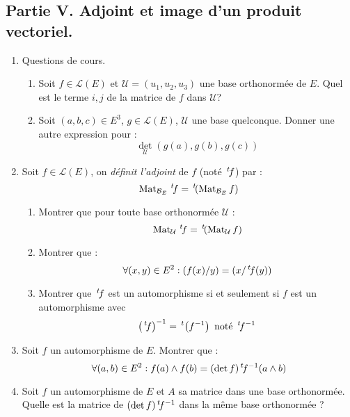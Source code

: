 \subsection*{Partie V. Adjoint et image d'un produit vectoriel.}
\begin{enumerate}
 \item Questions de cours.
\begin{enumerate}
 \item Soit $f\in \mathcal L(E)$ et $\mathcal U = (u_1,u_2,u_3)$ une base orthonormée de $E$. Quel est le terme $i,j$ de la matrice de $f$ dans $\mathcal U$?
\item Soit $(a,b,c)\in E^3$, $g\in \mathcal L(E)$, $\mathcal U$ une base quelconque. Donner une autre expression pour : 
\begin{displaymath}
\det_{\mathcal U}(g(a),g(b),g(c)) 
\end{displaymath}
\end{enumerate}
\item Soit $f\in \mathcal L(E)$, on \emph{définit l'adjoint} de $f$ (noté $\,\mathstrut^t\! f$) par :
\begin{displaymath}
 \operatorname{Mat}_{\mathcal B_E}\,\mathstrut^t\! f = \,\mathstrut^t\! ( \operatorname{Mat}_{\mathcal B_E}f) 
\end{displaymath}
\begin{enumerate}
 \item Montrer que pour toute base orthonormée $\mathcal U$ : 
\begin{displaymath}
 \operatorname{Mat}_{\mathcal U}\,\mathstrut^t\! f = \,\mathstrut^t\! ( \operatorname{Mat}_{\mathcal U}f) 
\end{displaymath}
\item Montrer que :
\begin{displaymath}
 \forall (x,y)\in E^2 : (f(x)/y) = (x/\,\mathstrut^t\! f(y))
\end{displaymath}
\item Montrer que $\,\mathstrut^t\! f$ est un automorphisme si et seulement si $f$ est un automorphisme avec
\begin{displaymath}
 \left( \,\mathstrut^t\! f\right)^{-1} = \,\mathstrut^t\!\left(  f^{-1}\right) \text{ noté } \,\mathstrut^t\! f ^{-1}
\end{displaymath}
\end{enumerate}
\item Soit $f$ un automorphisme de $E$. Montrer que :
\begin{displaymath}
 \forall (a,b)\in E^2 : f(a)\wedge f(b) = (\det f) \,\mathstrut^t\! f^{-1}(a \wedge b) 
\end{displaymath}
\item Soit $f$ un automorphisme de $E$ et $A$ sa matrice dans une base orthonormée. Quelle est la matrice de $(\det f) \,\mathstrut^t\! f^{-1}$ dans la même base orthonormée ?
\end{enumerate}


